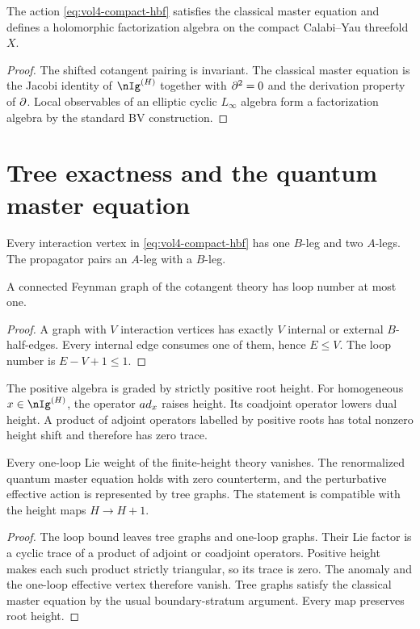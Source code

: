 \begin{theorem}
The action \eqref{eq:vol4-compact-hbf} satisfies the classical master equation and defines a holomorphic factorization algebra on the compact Calabi--Yau threefold $X$.
\end{theorem}
\begin{proof}
The shifted cotangent pairing is invariant.  The classical master equation is the Jacobi identity of $\nIg^{(H)}$ together with $\partial^2=0$ and the derivation property of $\partial$.  Local observables of an elliptic cyclic $L_\infty$ algebra form a factorization algebra by the standard BV construction.
\end{proof}

\chapter{Tree exactness and the quantum master equation}
Every interaction vertex in \eqref{eq:vol4-compact-hbf} has one $B$-leg and two $A$-legs.  The propagator pairs an $A$-leg with a $B$-leg.

\begin{lemma}
A connected Feynman graph of the cotangent theory has loop number at most one.
\end{lemma}
\begin{proof}
A graph with $V$ interaction vertices has exactly $V$ internal or external $B$-half-edges.  Every internal edge consumes one of them, hence $E\le V$.  The loop number is $E-V+1\le1$.
\end{proof}

The positive algebra is graded by strictly positive root height.  For homogeneous $x\in\nIg^{(H)}$, the operator $ad_x$ raises height.  Its coadjoint operator lowers dual height.  A product of adjoint operators labelled by positive roots has total nonzero height shift and therefore has zero trace.

\begin{theorem}
Every one-loop Lie weight of the finite-height theory vanishes.  The renormalized quantum master equation holds with zero counterterm, and the perturbative effective action is represented by tree graphs.  The statement is compatible with the height maps $H\to H+1$.
\end{theorem}
\begin{proof}
The loop bound leaves tree graphs and one-loop graphs.  Their Lie factor is a cyclic trace of a product of adjoint or coadjoint operators.  Positive height makes each such product strictly triangular, so its trace is zero.  The anomaly and the one-loop effective vertex therefore vanish.  Tree graphs satisfy the classical master equation by the usual boundary-stratum argument.  Every map preserves root height.
\end{proof}

